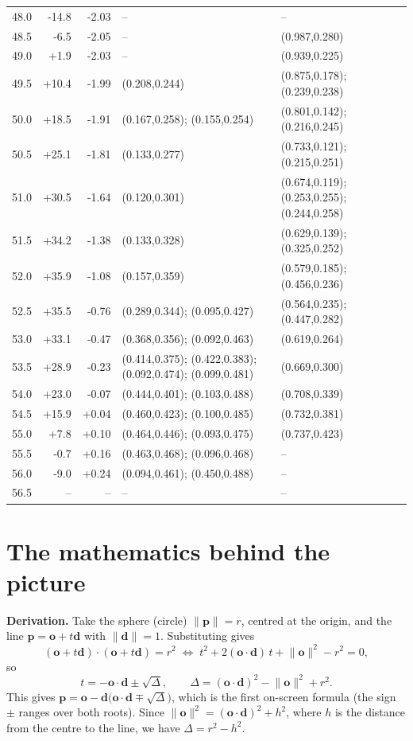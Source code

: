 \documentclass[10pt,a4paper]{article}
\newcommand{\vo}{\mathbf{o}}\newcommand{\vd}{\mathbf{d}}\newcommand{\vp}{\mathbf{p}}
\begin{document}
\begin{longtable}{@{}rrrp{55mm}p{55mm}@{}}
48.0 & -14.8 & -2.03 & -- & --\\
48.5 & -6.5 & -2.05 & -- & (0.987,0.280)\\
49.0 & +1.9 & -2.03 & -- & (0.939,0.225)\\
49.5 & +10.4 & -1.99 & (0.208,0.244) & (0.875,0.178); (0.239,0.238)\\
50.0 & +18.5 & -1.91 & (0.167,0.258); (0.155,0.254) & (0.801,0.142); (0.216,0.245)\\
50.5 & +25.1 & -1.81 & (0.133,0.277) & (0.733,0.121); (0.215,0.251)\\
51.0 & +30.5 & -1.64 & (0.120,0.301) & (0.674,0.119); (0.253,0.255); (0.244,0.258)\\
51.5 & +34.2 & -1.38 & (0.133,0.328) & (0.629,0.139); (0.325,0.252)\\
52.0 & +35.9 & -1.08 & (0.157,0.359) & (0.579,0.185); (0.456,0.236)\\
52.5 & +35.5 & -0.76 & (0.289,0.344); (0.095,0.427) & (0.564,0.235); (0.447,0.282)\\
53.0 & +33.1 & -0.47 & (0.368,0.356); (0.092,0.463) & (0.619,0.264)\\
53.5 & +28.9 & -0.23 & (0.414,0.375); (0.422,0.383); (0.092,0.474); (0.099,0.481) & (0.669,0.300)\\
54.0 & +23.0 & -0.07 & (0.444,0.401); (0.103,0.488) & (0.708,0.339)\\
54.5 & +15.9 & +0.04 & (0.460,0.423); (0.100,0.485) & (0.732,0.381)\\
55.0 & +7.8 & +0.10 & (0.464,0.446); (0.093,0.475) & (0.737,0.423)\\
55.5 & -0.7 & +0.16 & (0.463,0.468); (0.096,0.468) & --\\
56.0 & -9.0 & +0.24 & (0.094,0.461); (0.450,0.488) & --\\
56.5 & -- & -- & -- & --\\
\bottomrule
\end{longtable}

\section{The mathematics behind the picture}
\textbf{Derivation.} Take the sphere (circle) $\lVert\vp\rVert=r$, centred at the origin, and the line $\vp=\vo+t\vd$ with $\lVert\vd\rVert=1$. Substituting gives
\[
(\vo+t\vd)\cdot(\vo+t\vd)=r^2\;\Longleftrightarrow\; t^2+2(\vo\cdot\vd)\,t+\lVert\vo\rVert^2-r^2=0,
\]
so
\[
t=-\vo\cdot\vd\pm\sqrt{\Delta},\qquad \Delta=(\vo\cdot\vd)^2-\lVert\vo\rVert^2+r^2 .
\]
This gives $\vp=\vo-\vd\bigl(\vo\cdot\vd\mp\sqrt\Delta\bigr)$, which is the first on-screen formula (the sign $\pm$ ranges over both roots). Since $\lVert\vo\rVert^2=(\vo\cdot\vd)^2+h^2$, where $h$ is the distance from the centre to the line, we have $\Delta=r^2-h^2$.
\end{document}
